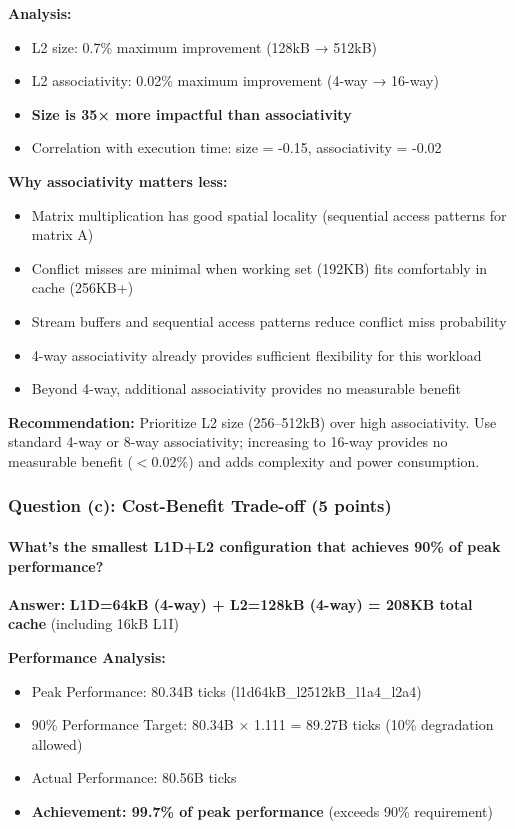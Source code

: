 \documentclass[11pt,a4paper]{article}
\begin{document}
\textbf{Analysis:}
\begin{itemize}[noitemsep]
    \item L2 size: 0.7\% maximum improvement (128kB → 512kB)
    \item L2 associativity: 0.02\% maximum improvement (4-way → 16-way)
    \item \textbf{Size is 35× more impactful than associativity}
    \item Correlation with execution time: size = -0.15, associativity = -0.02
\end{itemize}

\textbf{Why associativity matters less:}
\begin{itemize}[noitemsep]
    \item Matrix multiplication has good spatial locality (sequential access patterns for matrix A)
    \item Conflict misses are minimal when working set (192KB) fits comfortably in cache (256KB+)
    \item Stream buffers and sequential access patterns reduce conflict miss probability
    \item 4-way associativity already provides sufficient flexibility for this workload
    \item Beyond 4-way, additional associativity provides no measurable benefit
\end{itemize}

\textbf{Recommendation:} Prioritize L2 size (256--512kB) over high associativity. Use standard 4-way or 8-way associativity; increasing to 16-way provides no measurable benefit ($<$0.02\%) and adds complexity and power consumption.

\subsubsection{Question (c): Cost-Benefit Trade-off (5 points)}

\paragraph{What's the smallest L1D+L2 configuration that achieves 90\% of peak performance?}

\textbf{Answer:} \textbf{L1D=64kB (4-way) + L2=128kB (4-way) = 208KB total cache} (including 16kB L1I)

\textbf{Performance Analysis:}

\begin{itemize}[noitemsep]
    \item Peak Performance: 80.34B ticks (l1d64kB\_l2512kB\_l1a4\_l2a4)
    \item 90\% Performance Target: 80.34B × 1.111 = 89.27B ticks (10\% degradation allowed)
    \item Actual Performance: 80.56B ticks
    \item \textbf{Achievement: 99.7\% of peak performance} (exceeds 90\% requirement)
\end{itemize}
\end{document}
